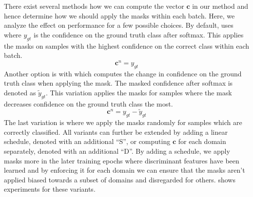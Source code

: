 There exist several methods how we can compute the vector $\mathbf{c}$ in our method and hence determine how we should apply the masks within each batch. Here, we analyze the effect on performance for a few possible choices. By default, \divcam uses  where $y_{gt}$ is the confidence on the ground truth class after softmax. This applies the masks on samples with the highest confidence on the correct class within each batch.   
\begin{equation}
\label{eq:conf_scamb}
	\mathbf{c}^n = y_{gt}
\end{equation}
Another option is \divcamc with  which computes the change in confidence on the ground truth class when applying the mask. The masked confidence after softmax is denoted as $\tilde{y}_{gt}$. This variation applies the masks for samples where the mask decreases confidence on the ground truth class the most.
\begin{equation}
\label{eq:conf_scamc}
   \mathbf{c}^n = y_{gt} - \tilde{y}_{gt}
\end{equation}
The last variation is \divcamt where we apply the masks randomly for samples which are correctly classified. All variants can further be extended by adding a linear schedule, denoted with an additional ``S'', or computing $\mathbf{c}$ for each domain separately, denoted with an additional ``D''. By adding a schedule, we apply masks more in the later training epochs where discriminant features have been learned and by enforcing it for each domain we can ensure that the masks aren't applied biased towards a subset of domains and disregarded for others.  shows experiments for these variants.


